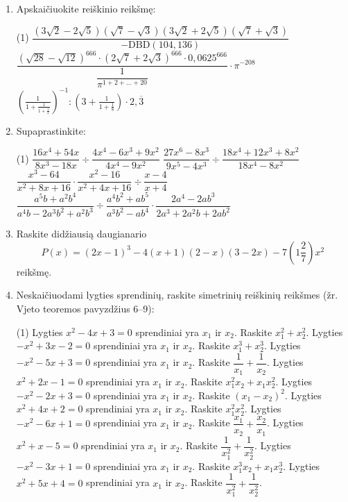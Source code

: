 \documentclass[12pt, a4paper]{article}
\begin{document}
\begin{enumerate}[label=\textbf{\arabic* užduotis.}, leftmargin=*]
    \item Apskaičiuokite reiškinio reikšmę:
    \begin{tasks}[label={(\arabic*)}, label-offset=0.9em](1)
        \task $\dfrac{(3\sqrt{2}-2\sqrt{5})(\sqrt{7}-\sqrt{3})(3\sqrt{2}+2\sqrt{5})(\sqrt{7}+\sqrt{3})}{-\text{DBD}(104,136)}$
        \task $\dfrac{(\sqrt{28}-\sqrt{12})^{666}\cdot(2\sqrt{7}+2\sqrt{3})^{666}\cdot 0{,}0625^{666}}{\dfrac{1}{\pi^{1+2+\ldots+20}}}\cdot\pi^{-208}$
        \task $\left(\frac{1}{1+\frac{1}{1+\frac{1}{2}}}\right)^{-1}:\left(3+\frac{1}{1+\frac{1}{8}}\right)\cdot 2{,}\overline{3}$
    \end{tasks}

    \item Supaprastinkite:
    \begin{tasks}[label={(\arabic*)}, label-offset=0.9em](1)
        \task $\dfrac{16x^4+54x}{8x^3-18x} \div \dfrac{4x^4-6x^3+9x^2}{4x^4-9x^2}$
        \task $\dfrac{27x^6-8x^3}{9x^5-4x^3} \div \dfrac{18x^4+12x^3+8x^2}{18x^4-8x^2}$
        \task $\dfrac{x^3-64}{x^2+8x+16} \cdot \dfrac{x^2-16}{x^2+4x+16} \div \dfrac{x-4}{x+4}$
        \task $\dfrac{a^5 b+a^2 b^4}{a^4 b-2 a^3 b^2+a^2 b^3} \div \dfrac{a^4 b^2+a b^5}{a^3 b^2-a b^4} \cdot \dfrac{2 a^4-2 a b^3}{2 a^3+2 a^2 b+2 a b^2}$
    \end{tasks}

    \item Raskite didžiausią daugianario
    $$P(x)=(2x-1)^3-4(x+1)(2-x)(3-2x)-7\left(1\frac{2}{7}\right)x^2$$
    reikšmę.

    \item Neskaičiuodami lygties sprendinių, raskite simetrinių reiškinių reikšmes (žr. Vjeto teoremos pavyzdžius 6–9):
    \begin{tasks}[label={(\arabic*)}, label-offset=0.9em](1)
        \task Lygties $x^2-4x+3=0$ sprendiniai yra $x_1$ ir $x_2$. Raskite $x_1^2+x_2^2$.
        \task Lygties $-x^2+3x-2=0$ sprendiniai yra $x_1$ ir $x_2$. Raskite $x_1^3+x_2^3$.
        \task Lygties $-x^2-5x+3=0$ sprendiniai yra $x_1$ ir $x_2$. Raskite $\dfrac{1}{x_1}+\dfrac{1}{x_2}$.
        \task Lygties $x^2+2x-1=0$ sprendiniai yra $x_1$ ir $x_2$. Raskite $x_1^2x_2+x_1x_2^2$.
        \task Lygties $-x^2-2x+3=0$ sprendiniai yra $x_1$ ir $x_2$. Raskite $(x_1-x_2)^2$.
        \task Lygties $x^2+4x+2=0$ sprendiniai yra $x_1$ ir $x_2$. Raskite $x_1^2x_2^2$.
        \task Lygties $-x^2-6x+1=0$ sprendiniai yra $x_1$ ir $x_2$. Raskite $\dfrac{x_1}{x_2}+\dfrac{x_2}{x_1}$.
        \task Lygties $x^2+x-5=0$ sprendiniai yra $x_1$ ir $x_2$. Raskite $\dfrac{1}{x_1^2}+\dfrac{1}{x_2^2}$.
        \task Lygties $-x^2-3x+1=0$ sprendiniai yra $x_1$ ir $x_2$. Raskite $x_1^3x_2+x_1x_2^3$.
        \task Lygties $x^2+5x+4=0$ sprendiniai yra $x_1$ ir $x_2$. Raskite $\dfrac{1}{x_1^2}+\dfrac{1}{x_2^2}$.
    \end{tasks}


\end{enumerate}
\end{document}
